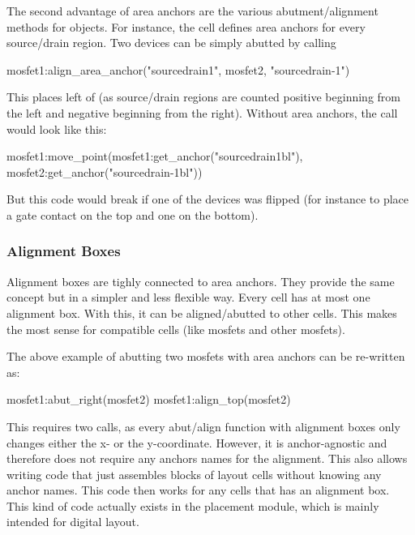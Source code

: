 The second advantage of area anchors are the various abutment/alignment methods for objects.
For instance, the  cell defines area anchors for every source/drain region.
Two devices can be simply abutted by calling
\begin{lualisting}
    mosfet1:align_area_anchor("sourcedrain1", mosfet2, "sourcedrain-1")
\end{lualisting}
This places  left of  (as source/drain regions are counted positive beginning from the left and negative beginning from the right).
Without area anchors, the call would look like this:
\begin{lualisting}
    mosfet1:move_point(mosfet1:get_anchor("sourcedrain1bl"), mosfet2:get_anchor("sourcedrain-1bl"))
\end{lualisting}
But this code would break if one of the devices was flipped (for instance to place a gate contact on the top and one on the bottom).

\subsubsection{Alignment Boxes}
Alignment boxes are tighly connected to area anchors.
They provide the same concept but in a simpler and less flexible way.
Every cell has at most one alignment box.
With this, it can be aligned/abutted to other cells.
This makes the most sense for compatible cells (like mosfets and other mosfets).

The above example of abutting two mosfets with area anchors can be re-written as:
\begin{lualisting}
    mosfet1:abut_right(mosfet2)
    mosfet1:align_top(mosfet2)
\end{lualisting}
This requires two calls, as every abut/align function with alignment boxes only changes either the x- or the y-coordinate.
However, it is anchor-agnostic and therefore does not require any anchors names for the alignment.
This also allows writing code that just assembles blocks of layout cells without knowing any anchor names.
This code then works for any cells that has an alignment box.
This kind of code actually exists in the placement module, which is mainly intended for digital layout.

